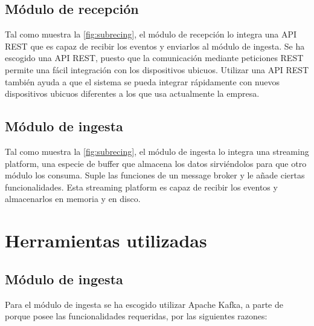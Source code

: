\subsection{Módulo de recepción}
Tal como muestra la \ref{fig:subrecing}, el módulo de recepción lo integra una API REST que es capaz de recibir los eventos y enviarlos al módulo de ingesta. Se ha escogido una API REST, puesto que la comunicación mediante peticiones REST permite una fácil integración con los dispositivos ubicuos. Utilizar una API REST también ayuda a que el sistema se pueda integrar rápidamente con nuevos dispositivos ubicuos diferentes a los que usa actualmente la empresa.

\subsection{Módulo de ingesta}
Tal como muestra la \ref{fig:subrecing}, el módulo de ingesta lo integra una streaming platform, una especie de buffer que almacena los datos sirviéndolos para que otro módulo los consuma. Suple las funciones de un message broker\cite{Tfg:messagebroker} y le añade ciertas funcionalidades. Esta streaming platform es capaz de recibir los eventos y almacenarlos en memoria y en disco.


\section{Herramientas utilizadas}

\subsection{Módulo de ingesta}
Para el módulo de ingesta se ha escogido utilizar Apache Kafka\cite{Tfg:kafka}, a parte de porque posee las funcionalidades requeridas, por las siguientes razones:

